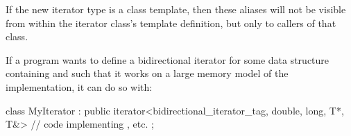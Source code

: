 \pnum
\begin{note} If the new iterator type is a class template, then these aliases
will not be visible from within the iterator class's template definition, but
only to callers of that class.\end{note}
 
\pnum
\begin{example}
If a \Cpp program wants to define a bidirectional iterator for some data
structure containing  and such that it works on a large memory
model of the implementation, it can do so with:

\begin{codeblock}
class MyIterator :
  public iterator<bidirectional_iterator_tag, double, long, T*, T&> {
  // code implementing \tcode{++}, etc.
};
\end{codeblock}
\end{example}
